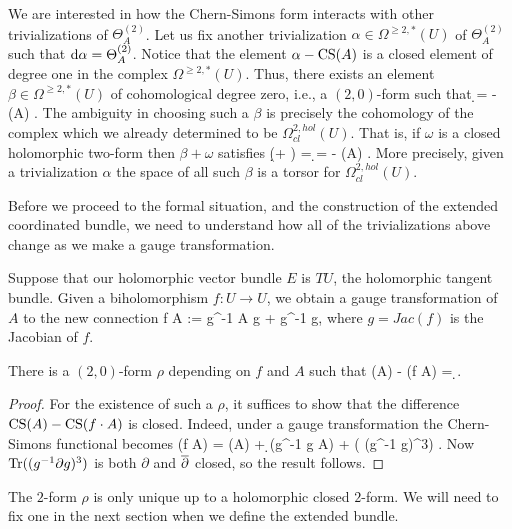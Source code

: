 We are interested in how the Chern-Simons form interacts with other trivializations of $\Theta^{(2)}_A$. 
Let us fix another trivialization $\alpha \in \Omega^{\geq 2, *} (U)$ of $\Theta^{(2)}_A$ 
such that ${\rm d} \alpha = \Theta^{(2)}_A$. 
Notice that the element $\alpha - {\rm CS}(A)$ is a closed element of degree one in the complex $\Omega^{\geq 2, *} (U)$. 
Thus, there exists an element $\beta \in \Omega^{\geq 2, *} (U)$ of cohomological degree zero, i.e., a $(2,0)$-form
such that
\ben
\d \beta = \alpha - \CS (A) .
\een
The ambiguity in choosing such a $\beta$ is precisely the cohomology
of the complex which we already determined to be
$\Omega^{2,hol}_{cl}(U)$. That is, if $\omega$ is a closed holomorphic
two-form then $\beta + \omega$ satisfies 
\ben
\d (\beta + \omega) = \d \beta = \alpha - \CS (A) .
\een
More precisely, given a trivialization $\alpha$ the space of all such $\beta$ is a torsor for
$\Omega^{2,hol}_{cl}(U)$. 

Before we proceed to the formal situation, and the construction of the extended coordinated bundle, 
we need to understand how all of the trivializations above change as we make a gauge transformation. 

Suppose that our holomorphic vector bundle $E$ is $TU$, the holomorphic tangent bundle. 
Given a biholomorphism $f : U \to U$, we obtain a gauge transformation of $A$ to the new connection
\ben
f \cdot A := g^{-1} A g + g^{-1} \partial g,
\een
where $g = Jac(f)$ is the Jacobian of $f$. 

\begin{lemma}\label{cs formula} 
There is a $(2,0)$-form $\rho$ depending on $f$ and $A$ such that
\ben
\CS(A) - \CS(f \cdot A) = \d \rho.
\een 
\end{lemma}

\begin{proof} 
For the existence of such a $\rho$, it suffices
to show that the difference ${\rm CS}(A) - {\rm CS}(f \cdot A)$ is closed. Indeed, under a gauge
transformation the Chern-Simons
functional becomes
\ben
\CS(f \cdot A) = \CS(A) + \d \Tr(g^{-1} \partial g \wedge A) + 
\Tr\left( (g^{-1} \partial g)^3\right) .
\een
Now ${\rm Tr}((g^{-1} \partial g)^3)$ is both $\partial$ and $\overline{\partial}$
closed, so the result follows.
\end{proof}

\begin{rmk} The $2$-form $\rho$ is only unique up to a holomorphic closed
$2$-form. We will need to fix one in the next section when we define
the extended bundle.
\end{rmk}

